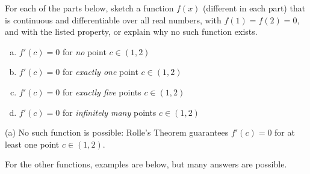 \begin{Mquestion}
For each of the parts below, sketch a function $f(x)$ (different in each part) that is continuous and differentiable over all real numbers, with $f(1)=f(2)=0$, and with
the listed property, or explain why no such function exists.
\begin{enumerate}[(a)]
\item $f'(c)=0$ for \emph{no} point $c \in (1,2)$
\item $f'(c)=0$ for \emph{exactly one} point $c \in (1,2)$
\item $f'(c)=0$ for \emph{exactly five} points $c \in (1,2)$
\item $f'(c)=0$ for \emph{infinitely many} points $c \in (1,2)$
\end{enumerate}
\end{Mquestion}
\begin{hint}
\end{hint}
\begin{answer}
(a) No such function is possible: Rolle's Theorem guarantees $f'(c)=0$ for at least one point $c \in (1,2)$.

For the other functions, examples are below, but many answers are possible.

\begin{center}
\hfill%
\hfill%
\end{center}
\end{answer}
